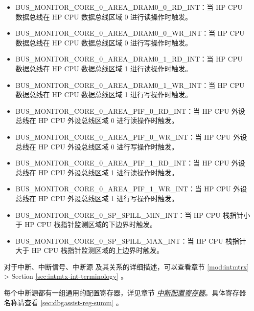 \documentclass[main\_\_CN.tex]{subfiles}
\begin{document}
\begin{itemize}
    \item \label{int:BUSMONITORCORE0AREADRAM00RDINT}BUS\_MONITOR\_CORE\_0\_AREA\_DRAM0\_0\_RD\_INT：当 HP CPU 数据总线在 HP CPU 数据总线区域 0 进行读操作时触发。
    \item \label{int:BUSMONITORCORE0AREADRAM00WRINT}BUS\_MONITOR\_CORE\_0\_AREA\_DRAM0\_0\_WR\_INT：当 HP CPU 数据总线在 HP CPU 数据总线区域 0 进行写操作时触发。
    \item \label{int:BUSMONITORCORE0AREADRAM01RDINT}BUS\_MONITOR\_CORE\_0\_AREA\_DRAM0\_1\_RD\_INT：当 HP CPU 数据总线在 HP CPU 数据总线区域 1 进行读操作时触发。
    \item \label{int:BUSMONITORCORE0AREADRAM01WRINT}BUS\_MONITOR\_CORE\_0\_AREA\_DRAM0\_1\_WR\_INT：当 HP CPU 数据总线在 HP CPU 数据总线区域 1 进行写操作时触发。
    \item \label{int:BUSMONITORCORE0AREAPIF0RDINT}BUS\_MONITOR\_CORE\_0\_AREA\_PIF\_0\_RD\_INT：当 HP CPU 外设总线在 HP CPU 外设总线区域 0 进行读操作时触发。
    \item \label{int:BUSMONITORCORE0AREAPIF0WRINT}BUS\_MONITOR\_CORE\_0\_AREA\_PIF\_0\_WR\_INT：当 HP CPU 外设总线在 HP CPU 外设总线区域 0 进行写操作时触发。
    \item \label{int:BUSMONITORCORE0AREAPIF1RDINT}BUS\_MONITOR\_CORE\_0\_AREA\_PIF\_1\_RD\_INT：当 HP CPU 外设总线在 HP CPU 外设总线区域 1 进行读操作时触发。
    \item \label{int:BUSMONITORCORE0AREAPIF1WRINT}BUS\_MONITOR\_CORE\_0\_AREA\_PIF\_1\_WR\_INT：当 HP CPU 外设总线在 HP CPU 外设总线区域 1 进行写操作时触发。
    \item \label{int:BUSMONITORCORE0SPSPILLMININT}BUS\_MONITOR\_CORE\_0\_SP\_SPILL\_MIN\_INT：当 HP CPU 栈指针小于 HP CPU 栈指针监测区域的下边界时触发。
    \item \label{int:BUSMONITORCORE0SPSPILLMAXINT}BUS\_MONITOR\_CORE\_0\_SP\_SPILL\_MAX\_INT：当 HP CPU 栈指针大于 HP CPU 栈指针监测区域的上边界时触发。
\end{itemize}

\begin{tiplisting}
对于中断、中断信号、中断源 及其关系的详细描述，可以查看章节 \ref{mod:intmtrx} \textit{} > Section \ref{sec:intmtx-int-terminology} \textit{}。
\end{tiplisting}

每个中断源都有一组通用的配置寄存器，详见章节 \hyperref[interrupt-config-registers]{\textit{中断配置寄存器}}。具体寄存器名称请查看 \ref{sec:dbgassist-reg-summ} \textit{}。
\end{document}
